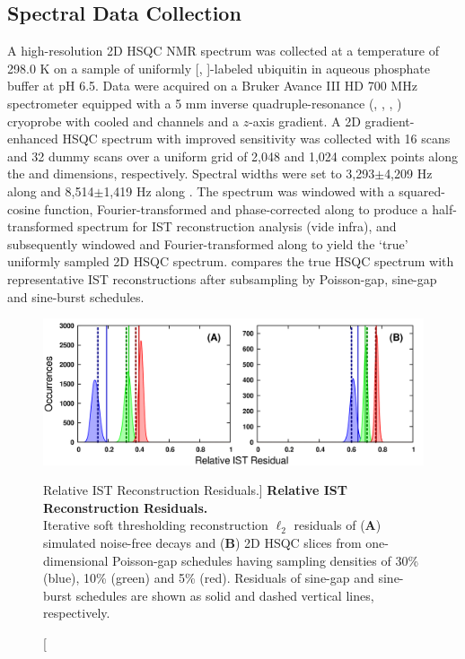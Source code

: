 \subsection{Spectral Data Collection}

\begin{doublespace}
A high-resolution 2D \hnnmr{} HSQC NMR spectrum was collected at a temperature
of 298.0 K on a sample of uniformly [\nnmr{}, \cnmr{}]-labeled ubiquitin in
aqueous phosphate buffer at pH 6.5. Data were acquired on a Bruker Avance
III HD 700 MHz spectrometer equipped with a 5 mm inverse quadruple-resonance
(\hnmr{}, \cnmr{}, \nnmr{}, \pnmr{}) cryoprobe with cooled \hnmr{} and \cnmr{}
channels and a $z$-axis gradient. A 2D gradient-enhanced \hnnmr{} HSQC spectrum
with improved sensitivity \cite{kay:jacs1992,palmer:jmr1991} was collected with
16 scans and 32 dummy scans over a uniform grid of 2,048 and 1,024 complex
points along the \hnmr{} and \nnmr{} dimensions, respectively. Spectral widths
were set to 3,293$\pm$4,209 Hz along \hnmr{} and 8,514$\pm$1,419 Hz along
\nnmr{}. The spectrum was windowed with a squared-cosine function,
Fourier-transformed and phase-corrected along \hnmr{} to produce a
half-transformed spectrum for IST reconstruction analysis (vide infra),
and subsequently windowed and Fourier-transformed along \nnmr{} to yield the
`true' uniformly sampled 2D \hnnmr{} HSQC spectrum. 
compares the true HSQC spectrum with representative IST reconstructions after
subsampling by Poisson-gap, sine-gap and sine-burst schedules.
\end{doublespace}

\begin{figure}[ht!]
\includegraphics[width=6in]{figs/dgs/07-residuals.png}
\caption
      [Relative IST Reconstruction Residuals.]{
  {\bf Relative IST Reconstruction Residuals.}
  \\
  Iterative soft thresholding reconstruction $\ell_2$ residuals of ({\bf A})
  simulated noise-free decays and ({\bf B}) 2D \hnnmr{} HSQC slices from
  one-dimensional Poisson-gap schedules having sampling densities of
  30\% (blue), 10\% (green) and 5\% (red). Residuals of sine-gap and sine-burst
  schedules are shown as solid and dashed vertical lines, respectively.
}
\label{figure.2.7}
\end{figure}

